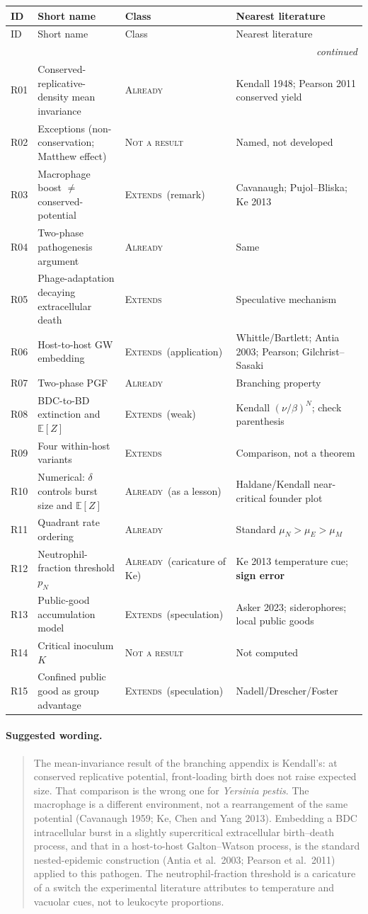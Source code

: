 \documentclass[11pt,a4paper]{report}
\newcommand{\yp}{\textit{Yersinia pestis}}
\newcommand{\cls}[1]{\textsc{#1}}
\newcommand{\ext}{\cls{Extends}}
\newcommand{\alr}{\cls{Already}}
\newcommand{\nar}{\cls{Not a result}}
\newcommand{\itemhead}{%
  \toprule
  ID & Short name & Class & Nearest literature \\
  \midrule
  \endfirsthead
  \toprule
  ID & Short name & Class & Nearest literature \\
  \midrule
  \endhead
  \midrule
  \multicolumn{4}{r}{\footnotesize\itshape continued} \\
  \endfoot
  \bottomrule
  \endlastfoot
}
\newcommand{\itemtable}{\begin{longtable}{L{1.55cm}L{4.35cm}L{2.35cm}L{6.55cm}}}
\begin{document}
\itemtable
\itemhead
R01 & Conserved-replicative-density mean invariance & \alr &
Kendall 1948; Pearson 2011 conserved yield \\
R02 & Exceptions (non-conservation; Matthew effect) & \nar &
Named, not developed \\
R03 & Macrophage boost \(\neq\) conserved-potential & \ext\ (remark) &
Cavanaugh; Pujol--Bliska; Ke 2013 \\
R04 & Two-phase pathogenesis argument & \alr & Same \\
R05 & Phage-adaptation decaying extracellular death & \ext &
Speculative mechanism \\
R06 & Host-to-host GW embedding & \ext\ (application) &
Whittle/Bartlett; Antia 2003; Pearson; Gilchrist--Sasaki \\
R07 & Two-phase PGF & \alr & Branching property \\
R08 & BDC-to-BD extinction and \(\mathbb{E}[Z]\) & \ext\ (weak) &
Kendall \((\nu/\beta)^N\); check parenthesis \\
R09 & Four within-host variants & \ext & Comparison, not a theorem \\
R10 & Numerical: \(\delta\) controls burst size and \(\mathbb{E}[Z]\) &
\alr\ (as a lesson) & Haldane/Kendall near-critical founder plot \\
R11 & Quadrant rate ordering & \alr & Standard \(\mu_N>\mu_E>\mu_M\) \\
R12 & Neutrophil-fraction threshold \(p_N\) & \alr\ (caricature of Ke) &
Ke 2013 temperature cue; \textbf{sign error} \\
R13 & Public-good accumulation model & \ext\ (speculation) &
Asker 2023; siderophores; local public goods \\
R14 & Critical inoculum \(K\) & \nar & Not computed \\
R15 & Confined public good as group advantage & \ext\ (speculation) &
Nadell/Drescher/Foster \\
\end{longtable}

\paragraph{Suggested wording.}
\begin{quote}
The mean-invariance result of the branching appendix is Kendall's: at
conserved replicative potential, front-loading birth does not raise
expected size. That comparison is the wrong one for \yp{}. The macrophage
is a different environment, not a rearrangement of the same potential
(Cavanaugh 1959; Ke, Chen and Yang 2013). Embedding a BDC intracellular
burst in a slightly supercritical extracellular birth--death process, and
that in a host-to-host Galton--Watson process, is the standard
nested-epidemic construction (Antia et al.\ 2003; Pearson et al.\ 2011)
applied to this pathogen. The neutrophil-fraction threshold is a
caricature of a switch the experimental literature attributes to
temperature and vacuolar cues, not to leukocyte proportions.
\end{quote}
\end{document}
